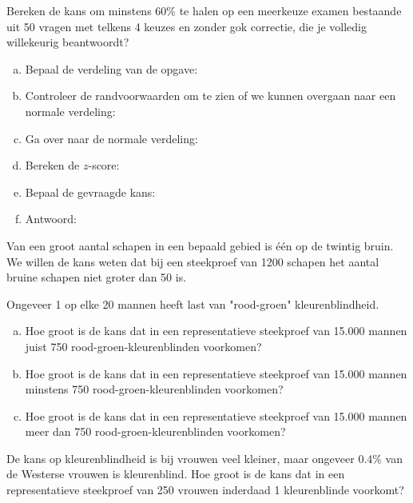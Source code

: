 \documentclass[a4paper,12pt, twoside]{article}
\begin{document}
\begin{oefening}
Bereken de kans om minstens 60\% te halen op een meerkeuze examen bestaande uit 50 vragen
met telkens 4 keuzes en zonder gok correctie, die je volledig willekeurig beantwoordt?
\begin{enumerate}[(a)]
  \itemsep0.2em
  \item Bepaal de verdeling van de opgave: \arulefill
  \item Controleer de randvoorwaarden om te zien of we kunnen overgaan naar een normale verdeling:
  \item Ga over naar de normale verdeling: \arulefill
  \item Bereken de $z$-score:\arulefill
  \item Bepaal de gevraagde kans:
  \item Antwoord: \arulefill
\end{enumerate}
\end{oefening}


\begin{oefening}
Van een groot aantal schapen in een bepaald gebied is één op de twintig bruin. We willen de kans weten dat bij een steekproef van 1200 schapen het aantal bruine schapen niet groter dan 50 is.
\end{oefening}

\begin{oefening}
Ongeveer 1 op elke 20 mannen heeft last van "rood-groen" kleurenblindheid.
\begin{enumerate}[(a)]
  \item Hoe groot is de kans dat in een representatieve steekproef van 15.000 mannen juist 750 rood-groen-kleurenblinden voorkomen?
  \item Hoe groot is de kans dat in een representatieve steekproef van 15.000 mannen minstens 750 rood-groen-kleurenblinden voorkomen?
  \item Hoe groot is de kans dat in een representatieve steekproef van 15.000 mannen meer dan 750 rood-groen-kleurenblinden voorkomen?
\end{enumerate}
\end{oefening}

\begin{oefening}
De kans op kleurenblindheid is bij vrouwen veel kleiner, maar ongeveer 0.4\% van de Westerse vrouwen is kleurenblind.
Hoe groot is de kans dat in een representatieve steekproef van 250 vrouwen inderdaad 1 kleurenblinde voorkomt?
\end{oefening}
\end{document}
